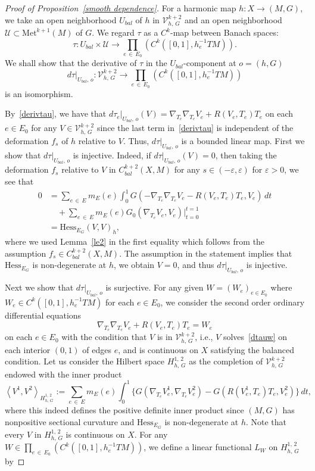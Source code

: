 \documentclass[11pt]{article}
\theoremstyle{definition}
\numberwithin{equation}{section}
\renewcommand{\t}{\tau}
\newcommand{\e}{\varepsilon}
\newcommand*\Uc{\mathcal{U}}
\newcommand*\Vc{\mathcal{V}}
\newcommand*\Hess{\mathrm{Hess}}
\newcommand*\Met{\mathrm{Met}}
\begin{document}
\begin{proof}[Proof of Proposition~\ref{smooth dependence}]
For a harmonic map $h:X \to (M, G)$, we take an open neighborhood $U_{bal}$ of $h$ in $\Vc_{h,\,G}^{k+2}$ and an open neighborhood $\Uc\subset \Met^{k+1}(M)$ of $G$. We regard $\tau$ as a $C^k$-map between Banach spaces:
\[
\tau: U_{bal}\times \Uc\to \prod_{e\,\in\,E_0}\left(C^k\left([0, 1], h_e^{-1}TM\right)\right).
\]
We shall show that the derivative of $\t$ in the $U_{bal}$-component at $o=(h, G)$
\[
d\tau|_{U_{bal},\,o}: \Vc_{h,\,G}^{k+2}\to \prod_{e\,\in\,E_0}\left(C^k\left([0, 1], h_e^{-1}TM\right)\right)
\]
is an isomorphism.

By~\eqref{derivtau}, we have that $d\tau_e|_{U_{bal},\,o}(V)=\nabla_{T_e}\nabla_{T_e}V_e+R(V_e, T_e)T_e$ on each $e \in E_0$ for any $V\in \Vc_{h,\, G}^{k+2}$ since the last term in~\eqref{derivtau} is independent of the deformation $f_s$ of $h$ relative to $V$. Thus, $d\tau|_{U_{bal},\,o}$ is a bounded linear map. First we show that $d\tau|_{U_{bal},\,o}$ is injective. Indeed, if $d\tau|_{U_{bal},\,o}(V)=0$, then taking the deformation $f_s$ relative to $V$ in $C^{k+2}_{bal}(X, M)$ for any $s\in (-\e, \e)$ for $\e>0$, we see that
\begin{align*}
0&=\sum_{e\,\in\,E}m_E(e)\int_0^1 G\left(-\nabla_{T_e}\nabla_{T_e}V_e-R\left(V_e, T_e\right)T_e, V_e\right)\, dt\\
&\quad+\sum_{e\,\in\,E}m_E(e)G_0\left(\nabla_{T_e}V_e, V_e\right)\Big|_{t=0}^{t=1}\\
&={\Hess}_{E_G}(V,V)_h,
\end{align*}
where we used Lemma~\ref{le2} in the first equality which follows from the assumption $f_s\in C^{k+2}_{bal}(X,M)$. The assumption in the statement implies that ${\Hess}_{E_G}$ is non-degenerate at $h$, we obtain $V=0$, and thus $d\tau|_{U_{bal},\,o}$ is injective.

Next we show that $d\tau|_{U_{bal},\,o}$ is surjective. For any given $W=(W_e)_{e \in E_0}$ where $W_e \in C^k([0, 1], h_e^{-1}TM)$ for each $e \in E_0$, we consider the second order ordinary differential equations
\begin{equation}\label{dtauw}
\nabla_{T_e}\nabla_{T_e}V_e+R(V_e, T_e)T_e=W_e
\end{equation}
on each $e \in E_0$ with the condition that $V$ is in $\Vc_{h,\,G}^{k+2}$, i.e., $V$ solves~\eqref{dtauw} on each interior $(0, 1)$ of edges $e$, and is continuous on $X$ satisfying the balanced condition. Let us consider the Hilbert space $H^{1, \,2}_{h,\,G}$ as the completion of $\Vc_{h,\,G}^{k+2}$ endowed with the inner product
\[
\left\langle V^1, V^2\right\rangle_{H_{h,\,G}^{1,\,2}}:=\sum_{e \,\in\,E}m_E(e)\int_0^1\Big\{G\left(\nabla_{T_e}V_e^1, \nabla_{T_e}V_e^2\right)-G\left(R\left(V_e^1, T_e\right)T_e, V_e^2\right)\Big\}\,dt,
\]
where this indeed defines the positive definite inner product since $(M, G)$ has nonpositive sectional curvature and ${\Hess}_{E_G}$ is non-degenerate at $h$. Note that every $V$ in $H^{1,\,2}_{h,\,G}$ is continuous on $X$. For any $W \in \prod_{e\,\in\,E_0}(C^k([0, 1], h_e^{-1}TM))$, we define a linear functional $L_W$ on $H^{1,\,2}_{h,\, G}$ by


\end{proof}
\end{document}
